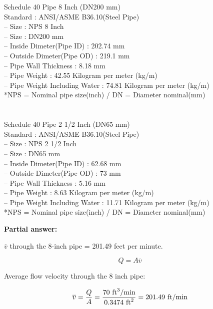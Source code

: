 Schedule 40 Pipe 8 Inch (DN200 mm)\\
Standard : ANSI/ASME B36.10(Steel Pipe)\\
– Size : NPS 8 Inch\\
– Size : DN200 mm\\
– Inside Dimeter(Pipe ID) : 202.74 mm\\
– Outside Dimeter(Pipe OD) : 219.1 mm\\
– Pipe Wall Thickness : 8.18 mm\\
– Pipe Weight : 42.55 Kilogram per meter (kg/m)\\
– Pipe Weight Including Water : 74.81 Kilogram per meter (kg/m)\\
*NPS = Nominal pipe size(inch) / DN = Diameter nominal(mm)\\
\\\\
Schedule 40 Pipe 2 1/2 Inch (DN65 mm)\\
Standard : ANSI/ASME B36.10(Steel Pipe)\\
– Size : NPS 2 1/2 Inch\\
– Size : DN65 mm\\
– Inside Dimeter(Pipe ID) : 62.68 mm\\
– Outside Dimeter(Pipe OD) : 73 mm\\
– Pipe Wall Thickness : 5.16 mm\\
– Pipe Weight : 8.63 Kilogram per meter (kg/m)\\
– Pipe Weight Including Water : 11.71 Kilogram per meter (kg/m)\\
*NPS = Nominal pipe size(inch) / DN = Diameter nominal(mm)\\






\noindent
{\bf Partial answer:}

\vskip 10pt

$\overline{v}$ through the 8-inch pipe = 201.49 feet per minute.







$$Q = A \overline{v}$$

Average flow velocity through the 8 inch pipe:

$$\overline{v} = {Q \over A} = {70 \hbox{ ft}^3/\hbox{min} \over 0.3474 \hbox{ ft}^2} = 201.49 \hbox{ ft/min}$$

